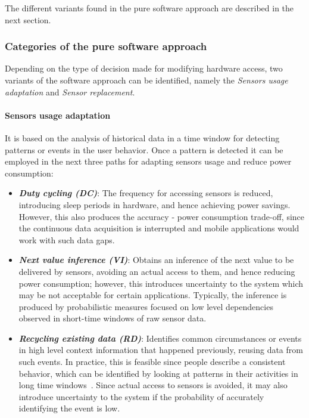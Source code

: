 \documentclass[ENG,PhD]{cinvestav}
\begin{document}
The different variants found in the pure software approach are described in the next section.



\subsubsection{Categories of the pure software approach}
\label{sub:software-categories}
Depending on the type of decision made for modifying hardware access, two variants of the software approach can be identified, namely the \emph{Sensors usage adaptation} and \emph{Sensor replacement}.



\paragraph{Sensors usage adaptation}
It is based on the analysis of historical data in a time window for detecting patterns or events in the user behavior.
Once a pattern is detected it can be employed in the next three paths for adapting sensors usage and reduce power consumption:
\begin{itemize}
  \item \emph{\textbf{Duty cycling (DC)}}:  The frequency for accessing sensors is reduced, introducing sleep periods in hardware, and hence achieving power savings.
  However, this also produces the accuracy - power consumption trade-off, since the continuous data acquisition is interrupted and mobile applications would work with such data gaps.
  \item \emph{\textbf{Next value inference (VI)}}: Obtains an inference of the next value to be delivered by sensors, avoiding an actual access to them, and hence reducing power consumption; however, this introduces uncertainty to the system which may be not acceptable for certain applications.
  Typically, the inference is produced by probabilistic measures focused on low level dependencies observed in short-time windows of raw sensor data.
  \item \emph{\textbf{Recycling existing data (RD)}}: Identifies common circumstances or events in high level context information that happened previously, reusing data from such events.
  In practice, this is feasible since people describe a consistent behavior, which can be identified by looking at patterns in their activities in long time windows~\cite{Chon2011,Paek2011}.
  Since actual access to sensors is avoided, it may also introduce uncertainty to the system if the probability of accurately identifying the event is low.
\end{itemize}
\end{document}
